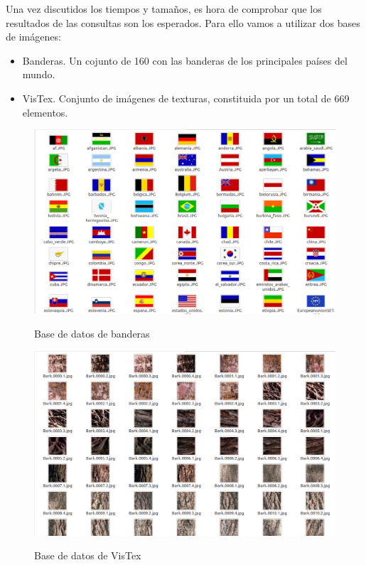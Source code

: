 Una vez discutidos los tiempos y tamaños, es hora de comprobar que los resultados de las consultas son los esperados. Para ello vamos a utilizar dos bases de imágenes:\\

\begin{itemize}

\item Banderas. Un cojunto de 160 con las banderas de los principales países del mundo.

\item VisTex. Conjunto de imágenes de texturas, constituida por un total de 669 elementos.

\end{itemize}

\begin{figure}[H] %
\centering
\includegraphics[scale=0.4]{imagenes/banderas.png}  %
\label{banderas}
\caption{Base de datos de banderas}
\end{figure}

\begin{figure}[H] %
\centering
\includegraphics[scale=0.4]{imagenes/texturas.png}  %
\label{texturas}
\caption{Base de datos de VisTex}
\end{figure}

